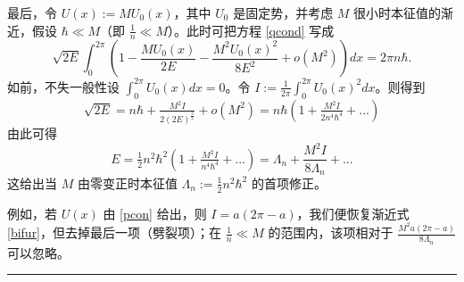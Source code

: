 最后，令 $U(x):=MU_0(x)$，其中 $U_0$ 是固定势，并考虑 $M$ 很小时本征值的渐近，假设 $\hbar \ll M$（即 $\frac{1}{n}\ll M$）。此时可把方程 \eqref{qcond} 写成
\begin{equation}\label{qcond1}
\sqrt{2E}\int_0^{2\pi} \left(1-\frac{MU_0(x)}{2E}-\frac{M^2U_0(x)^2}{8E^2}+o(M^2)\right)dx=2\pi n\hbar.
\end{equation} 
如前，不失一般性设 $\int_0^{2\pi} U_0(x)dx=0$。令 $I:=\frac{1}{2\pi}\int_0^{2\pi}U_0(x)^2dx$。则得到
\begin{equation}\label{qcond2}
\sqrt{2E}=n\hbar+\tfrac{M^2I}{2(2 E)^\frac{3}{2}}+o(M^2)=n\hbar(1+\tfrac{M^2I}{2n^4\hbar^4}+...)
\end{equation} 
由此可得
$$
E=\tfrac{1}{2}n^2\hbar^2(1+\tfrac{M^2I}{n^4\hbar^4}+...)=\Lambda_n+\frac{M^2I}{8\Lambda_n}+...
$$
这给出当 $M$ 由零变正时本征值 $\Lambda_n:=\tfrac{1}{2}n^2\hbar^2$ 的首项修正。

例如，若 $U(x)$ 由 \eqref{pcon} 给出，则 $I=a(2\pi-a)$，我们便恢复渐近式 \eqref{bifur}，但去掉最后一项（劈裂项）；在 $\frac{1}{n}\ll M$ 的范围内，该项相对于
 $\frac{M^2a(2\pi-a)}{8\Lambda_n}$ 可以忽略。

\bigskip
\noindent\rule{\textwidth}{0.6pt}
